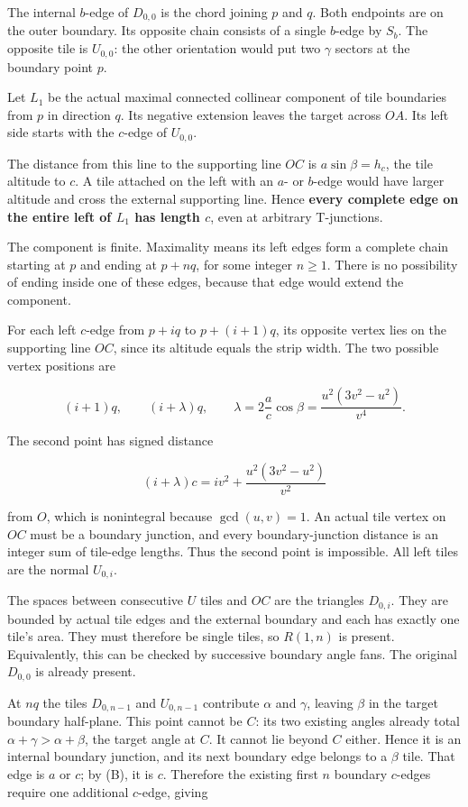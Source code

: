 \documentclass[
  11pt,
  a4paper,
]{article}
\begin{document}
The internal \(b\)-edge of \(D_{0,0}\) is the chord joining \(p\) and
\(q\). Both endpoints are on the outer boundary. Its opposite chain
consists of a single \(b\)-edge by \(S_b\). The opposite tile is
\(U_{0,0}\): the other orientation would put two \(\gamma\) sectors at
the boundary point \(p\).

Let \(L_1\) be the actual maximal connected collinear component of tile
boundaries from \(p\) in direction \(q\). Its negative extension leaves
the target across \(OA\). Its left side starts with the \(c\)-edge of
\(U_{0,0}\).

The distance from this line to the supporting line \(OC\) is
\(a\sin\beta=h_c\), the tile altitude to \(c\). A tile attached on the
left with an \(a\)- or \(b\)-edge would have larger altitude and cross
the external supporting line. Hence \textbf{every complete edge on the
entire left of \(L_1\) has length \(c\)}, even at arbitrary T-junctions.

The component is finite. Maximality means its left edges form a complete
chain starting at \(p\) and ending at \(p+nq\), for some integer
\(n\ge1\). There is no possibility of ending inside one of these edges,
because that edge would extend the component.

For each left \(c\)-edge from \(p+iq\) to \(p+(i+1)q\), its opposite
vertex lies on the supporting line \(OC\), since its altitude equals the
strip width. The two possible vertex positions are

\[
(i+1)q,\qquad(i+\lambda)q,
\qquad \lambda=2\frac ac\cos\beta
=\frac{u^2(3v^2-u^2)}{v^4}.
\]

The second point has signed distance

\[
(i+\lambda)c=iv^2+\frac{u^2(3v^2-u^2)}{v^2}
\]

from \(O\), which is nonintegral because \(\gcd(u,v)=1\). An actual tile
vertex on \(OC\) must be a boundary junction, and every
boundary-junction distance is an integer sum of tile-edge lengths. Thus
the second point is impossible. All left tiles are the normal
\(U_{0,i}\).

The spaces between consecutive \(U\) tiles and \(OC\) are the triangles
\(D_{0,i}\). They are bounded by actual tile edges and the external
boundary and each has exactly one tile's area. They must therefore be
single tiles, so \(R(1,n)\) is present. Equivalently, this can be
checked by successive boundary angle fans. The original \(D_{0,0}\) is
already present.

At \(nq\) the tiles \(D_{0,n-1}\) and \(U_{0,n-1}\) contribute
\(\alpha\) and \(\gamma\), leaving \(\beta\) in the target boundary
half-plane. This point cannot be \(C\): its two existing angles already
total \(\alpha+\gamma>\alpha+\beta\), the target angle at \(C\). It
cannot lie beyond \(C\) either. Hence it is an internal boundary
junction, and its next boundary edge belongs to a \(\beta\) tile. That
edge is \(a\) or \(c\); by (B), it is \(c\). Therefore the existing
first \(n\) boundary \(c\)-edges require one additional \(c\)-edge,
giving
\end{document}
